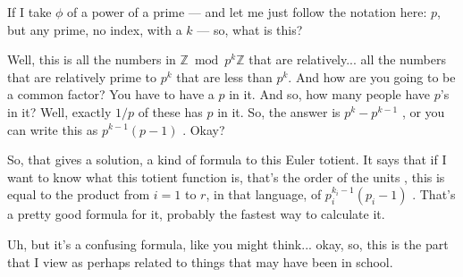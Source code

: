 \begin{content}
\end{content}

\begin{speech}[00:19:16 - 00:20:45]
If I take $\phi$ of a power of a prime  --- and let me just follow the notation here: $p$, but any prime, no index, with a $k$ --- so, what is this?

Well, this is all the numbers in $\mathbb{Z} \bmod p^k \mathbb{Z}$ that are relatively... all the numbers that are relatively prime to $p^k$ that are less than $p^k$. And how are you going to be a common factor? You have to have a $p$ in it. And so, how many people have $p$'s in it? Well, exactly $1/p$ of these has $p$ in it. So, the answer is $p^k - p^{k-1}$ , or you can write this as $p^{k-1}(p - 1)$ . Okay?

So, that gives a solution, a kind of formula to this Euler totient. It says that if I want to know what this totient function is, that's the order of the units , this is equal to the product from $i = 1$ to $r$, in that language, of $p_i^{k_i - 1}(p_i - 1)$ . That's a pretty good formula for it, probably the fastest way to calculate it.

Uh, but it's a confusing formula, like you might think... okay, so, this is the part that I view as perhaps related to things that may have been in school.
\end{speech}

